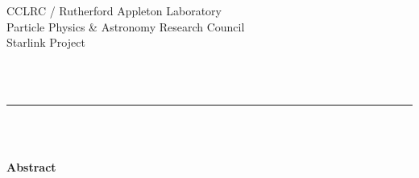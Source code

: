 \renewcommand{\thepage}{\roman{page}}

\thispagestyle{empty}

\begin{latexonly}
   CCLRC / {\sc Rutherford Appleton Laboratory} \hfill {\bf \stardocname}\\
   {\large Particle Physics \& Astronomy Research Council}\\
   {\large Starlink Project\\}
   {\large \stardoccategory\ \stardocnumber}
   \begin{flushright}
   \stardocauthors\\
   \stardocdate
   \end{flushright}
   \vspace{-4mm}
   \rule{\textwidth}{0.5mm}
   \vspace{5mm}
   \begin{center}
   {\Huge  \bf \stardoctitle \\ [2.5ex]}
   {\Large \bf \stardoconeline \\ [4ex]}
   {\large \bf \stardocversion}
   \end{center}
   \vspace{5mm}

   \vspace{10mm}
   \begin{center}
      {\Large\bf Abstract}
   \end{center}
\end{latexonly}

